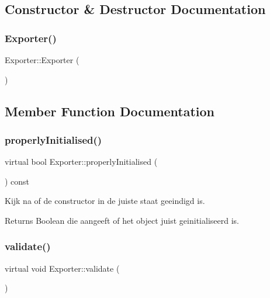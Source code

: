\subsection{Constructor \& Destructor Documentation}
\mbox{\label{class_exporter_a2a977cb5ac8f637fcb570e73f650eca0}} 
\subsubsection{\texorpdfstring{Exporter()}{Exporter()}}
{\footnotesize\ttfamily Exporter\+::\+Exporter (\begin{DoxyParamCaption}{ }\end{DoxyParamCaption})}



\subsection{Member Function Documentation}
\mbox{\label{class_exporter_afb6185b8276c2fd03da53f49e4da295b}} 
\subsubsection{\texorpdfstring{properly\+Initialised()}{properlyInitialised()}}
{\footnotesize\ttfamily virtual bool Exporter\+::properly\+Initialised (\begin{DoxyParamCaption}{ }\end{DoxyParamCaption}) const\hspace{0.3cm}{\ttfamily [virtual]}}



Kijk na of de constructor in de juiste staat geeindigd is. 

\begin{DoxyReturn}{Returns}
Boolean die aangeeft of het object juist geinitialiseerd is. 
\end{DoxyReturn}
\mbox{\label{class_exporter_a585f97d4204275edcb831df9215a0099}} 
\subsubsection{\texorpdfstring{validate()}{validate()}}
{\footnotesize\ttfamily virtual void Exporter\+::validate (\begin{DoxyParamCaption}{ }\end{DoxyParamCaption})\hspace{0.3cm}{\ttfamily [virtual]}}



